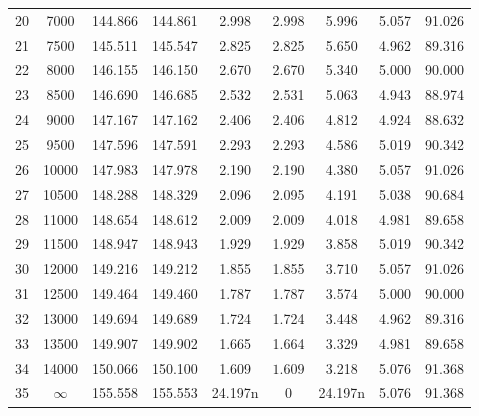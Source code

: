 \documentclass[12pt]{article}%
\begin{document}
\begin{table}[htbp]
\begin{tabular}{ccccccccc}
20 & 7000 & 144.866  & 144.861  & 2.998  & 2.998  & 5.996  & 5.057  & 91.026  \\
21 & 7500 & 145.511  & 145.547  & 2.825  & 2.825  & 5.650  & 4.962  & 89.316  \\
22 & 8000 & 146.155  & 146.150  & 2.670  & 2.670  & 5.340  & 5.000  & 90.000  \\
23 & 8500 & 146.690  & 146.685  & 2.532  & 2.531  & 5.063  & 4.943  & 88.974  \\
24 & 9000 & 147.167  & 147.162  & 2.406  & 2.406  & 4.812  & 4.924  & 88.632  \\
25 & 9500 & 147.596  & 147.591  & 2.293  & 2.293  & 4.586  & 5.019  & 90.342  \\
26 & 10000 & 147.983  & 147.978  & 2.190  & 2.190  & 4.380  & 5.057  & 91.026  \\
27 & 10500 & 148.288  & 148.329  & 2.096  & 2.095  & 4.191  & 5.038  & 90.684  \\
28 & 11000 & 148.654  & 148.612  & 2.009  & 2.009  & 4.018  & 4.981  & 89.658  \\
29 & 11500 & 148.947  & 148.943  & 1.929  & 1.929  & 3.858  & 5.019  & 90.342  \\
30 & 12000 & 149.216  & 149.212  & 1.855  & 1.855  & 3.710  & 5.057  & 91.026  \\
31 & 12500 & 149.464  & 149.460  & 1.787  & 1.787  & 3.574  & 5.000  & 90.000  \\
32 & 13000 & 149.694  & 149.689  & 1.724  & 1.724  & 3.448  & 4.962  & 89.316  \\
33 & 13500 & 149.907  & 149.902  & 1.665  & 1.664  & 3.329  & 4.981  & 89.658  \\
34 & 14000 & 150.066  & 150.100  & 1.609  & $1.609$  & 3.218  & 5.076  & 91.368  \\
    35 &$\infty$ & 155.558  & 155.553  & 24.197n & 0  &  24.197n  & 5.076  & 91.368  \\
    \hline
    \end{tabular}%
  \label{tab:addlabel1}%
\end{table}%
\end{document}
